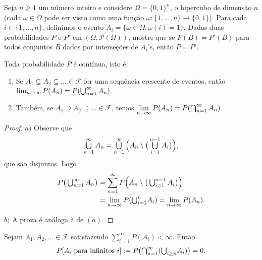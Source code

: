 \begin{exercise}
  Seja $n \geq 1$ um número inteiro e considere $\Omega = \{0, 1\}^n$, o hipercubo de dimensão $n$ (cada $\omega \in \Omega$ pode ser visto como uma função $\omega:\{1, \dots, n\} \to \{0,1\}$).
  Para cada $i \in \{1, \dots, n\}$, definimos o evento $A_i = \{ \omega \in \Omega; \omega(i) = 1 \}$.
  Dadas duas probabilidades $P$ e $P'$ em $(\Omega, \mathcal{P}(\Omega))$, mostre que se $P(B) = P'(B)$ para todos conjuntos $B$ dados por interseções de $A_i$'s, então $P = P'$.
\end{exercise}

\begin{proposition}
  \label{p:prob_continua}
  Toda probabilidade $P$ é contínua, isto é:
  \begin{enumerate}[\quad a)]
  \item Se $A_1 \subseteq A_2 \subseteq \dots \in \mathcal{F}$ for uma sequência crescente de eventos, então \\
  $\lim_{n\to \infty} P(A_n) = P(\operatorname*{{\textstyle \bigcup}}\nolimits_{n=1}^{\infty} A_n)$.
  \item Também, se $A_1 \supseteq A_2 \supseteq \dots \in \mathcal{F}$, temos $\lim\limits _{n\to \infty} P(A_n) = P(\operatorname*{{\textstyle \bigcap}}\nolimits_{n=1}^{\infty} A_n)$.
  \end{enumerate}
\end{proposition}

\begin{proof}
  $a)$ Observe que
  \begin{equation}
    \operatorname*{{\textstyle \bigcup}}_{n = 1}^\infty A_n = \operatorname*{{\textstyle \bigcup}}_{n = 1}^\infty \Big( A_n \setminus \big( \operatorname*{{\textstyle \bigcup}}_{i=1}^{n-1} A_i \big) \Big),
  \end{equation}
  que são disjuntos.
  Logo
  \begin{equation}
    \begin{split}
      P\big(\operatorname*{{\textstyle \bigcup}}\nolimits_{n = 1}^\infty A_n\big) & = \sum_{n = 1}^\infty P\Big( A_n \setminus \big(\operatorname*{{\textstyle \bigcup}}\nolimits_{i=1}^{n-1} A_i \big) \Big)\\
      & = \lim_{n\to \infty} P({\operatorname*{{\textstyle \bigcup}}\nolimits_{i = 1}^n} A_i) = \lim_{n\to \infty} P(A_n).
    \end{split}
  \end{equation}

  $b)$ A prova é análoga à de $(a)$.
\end{proof}

\begin{lemma}
  Sejam $A_1, A_2, \dots \in \mathcal{F}$ satisfazendo $\sum_{i = 1}^\infty P(A_i) < \infty$.
  Então
  \begin{equation}
    P[\text{$A_i$ para infinitos $i$}] := P\big({\operatorname*{{\textstyle \bigcap}}\nolimits_{n = 1}^\infty} ({\operatorname*{{\textstyle \bigcup}}\nolimits_{i \geq n}} A_i)\big) = 0.
  \end{equation}
\end{lemma}

